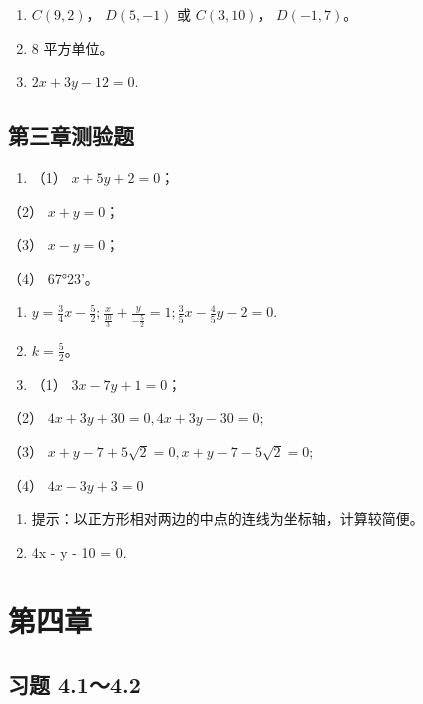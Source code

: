 \begin{enumerate}
\def\labelenumi{\arabic{enumi}.}
\setcounter{enumi}{8}
\item
  \(C(9, 2)\)， \(D(5, -1)\) 或 \(C(3, 10)\)， \(D(-1, 7)\)。
\item
  8 平方单位。
\item
  \(2x + 3y - 12 = 0.\)
\end{enumerate}

\subsection{第三章测验题}\label{ux7b2cux4e09ux7ae0ux6d4bux9a8cux9898-1}

\begin{enumerate}
\def\labelenumi{\arabic{enumi}.}
\tightlist
\item
  （1） \(x + 5y + 2 = 0\)；
\end{enumerate}

（2） \(x + y = 0\)；

（3） \(x - y = 0\)；

（4） 67°23'。

\begin{enumerate}
\def\labelenumi{\arabic{enumi}.}
\setcounter{enumi}{1}
\item
  \(y = \frac{3}{4} x - \frac{5}{2}; \frac{x}{\frac{10}{3}} + \frac{y}{-\frac{5}{2}} = 1; \frac{3}{5} x - \frac{4}{5} y - 2 = 0.\)
\item
  \(k = \frac{5}{2}\)。
\item
  （1） \(3x - 7y + 1 = 0\)；
\end{enumerate}

（2） \(4x + 3y + 30 = 0, 4x + 3y - 30 = 0;\)

（3） \(x + y - 7 + 5\sqrt{2} = 0, x + y - 7 - 5\sqrt{2} = 0;\)

（4） \(4x - 3y + 3 = 0\)

\begin{enumerate}
\def\labelenumi{\arabic{enumi}.}
\setcounter{enumi}{4}
\item
  提示：以正方形相对两边的中点的连线为坐标轴，计算较简便。
\item
  4x - y - 10 = 0.
\end{enumerate}

\section{第四章}\label{ux7b2cux56dbux7ae0}

\subsection{习题 4.1～4.2}\label{ux4e60ux9898-4.14.2}

